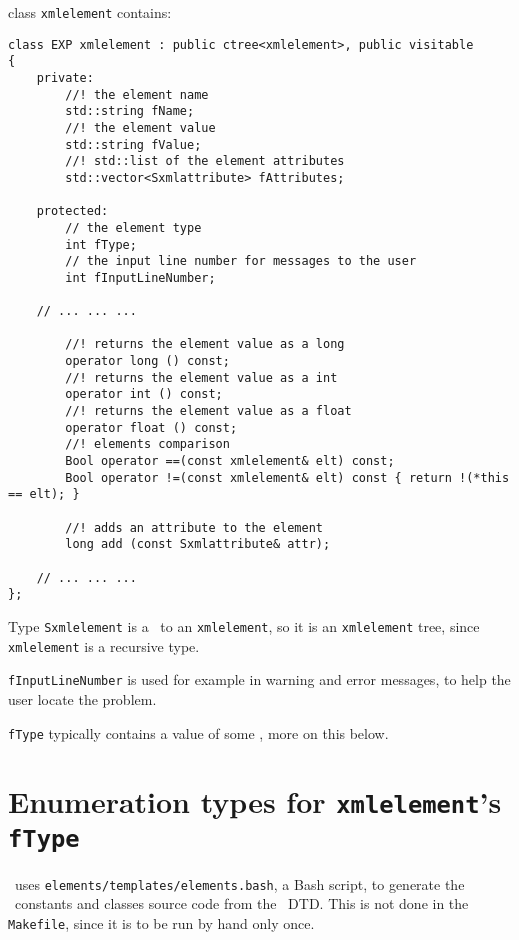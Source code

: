 class   {\tt xmlelement} contains:
\begin{lstlisting}[language=CPlusPlus]
class EXP xmlelement : public ctree<xmlelement>, public visitable
{
	private:
		//! the element name
		std::string fName;
		//! the element value
		std::string fValue;
		//! std::list of the element attributes
		std::vector<Sxmlattribute> fAttributes;

	protected:
		// the element type
		int fType;
		// the input line number for messages to the user
		int fInputLineNumber;

	// ... ... ...

		//! returns the element value as a long
		operator long () const;
		//! returns the element value as a int
		operator int () const;
		//! returns the element value as a float
		operator float () const;
		//! elements comparison
		Bool operator ==(const xmlelement& elt) const;
		Bool operator !=(const xmlelement& elt) const { return !(*this == elt); }

		//! adds an attribute to the element
		long add (const Sxmlattribute& attr);

	// ... ... ...
};
\end{lstlisting}

Type {\tt Sxmlelement} is a \smart\ to an {\tt xmlelement}, so it is an {\tt xmlelement} tree, since {\tt xmlelement} is a recursive type.

{\tt fInputLineNumber} is used for example in warning and error messages, to help the user locate the problem.

{\tt fType} typically contains a value of some \enumType, more on this below.


\section{Enumeration types for {\tt xmlelement}'s {\tt fType}}

\libmusicxml\ uses {\tt elements/templates/elements.bash}, a Bash script, to generate the \enumType\ constants and classes source code from the \mxml\ DTD. This is not done in the {\tt Makefile}, since it is to be run by hand only once.

